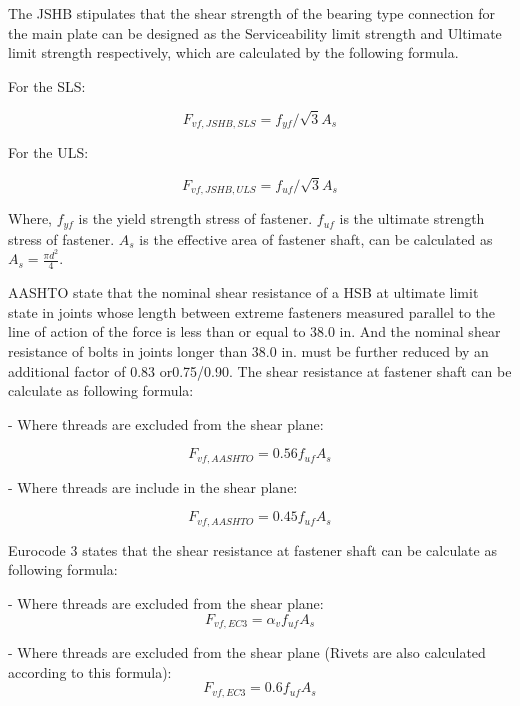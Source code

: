 The \ac{JSHB} stipulates that the shear strength of the bearing type connection for the main plate can be designed as the Serviceability limit strength and Ultimate limit strength respectively, which are calculated by the following formula.

For the SLS:

\begin{equation}
    F_{vf,JSHB,SLS} = f_{yf}/\sqrt{3}A_s
\end{equation}

For the ULS:

\begin{equation}
    F_{vf,JSHB,ULS} = f_{uf}/\sqrt{3}A_s
\end{equation}


Where, $f_{yf}$ is the yield strength stress of fastener. $f_{uf}$ is the ultimate strength stress of fastener. $A_s$ is the effective area of fastener shaft, can be calculated as $A_s = \frac{\pi d^2}{4}$.

\ac{AASHTO} \cite{AASHTO2020} state that the nominal shear resistance of a HSB at ultimate limit state in joints whose length between extreme fasteners measured parallel to the line of action of the force is less than or equal to 38.0 in. And the nominal shear resistance of bolts in joints longer than 38.0 in. must be further reduced by an additional factor of 0.83 or0.75/0.90.
The shear resistance at fastener shaft can be calculate as following formula:

- Where threads are excluded from the shear plane:

\begin{equation}
    F_{vf,AASHTO} = 0.56f_{uf}A_s
\end{equation}

- Where threads are include in the shear plane:

\begin{equation}
    F_{vf,AASHTO} = 0.45f_{uf}A_s
\end{equation}

Eurocode 3 states that the  shear resistance at fastener shaft can be calculate as following formula:

- Where threads are excluded from the shear plane:
\begin{equation}
    F_{vf,EC3} = \alpha_v f_{uf}A_s
\end{equation}

- Where threads are excluded from the shear plane (Rivets are also calculated according to this formula):
\begin{equation}
    F_{vf,EC3} = 0.6 f_{uf}A_s
\end{equation}

